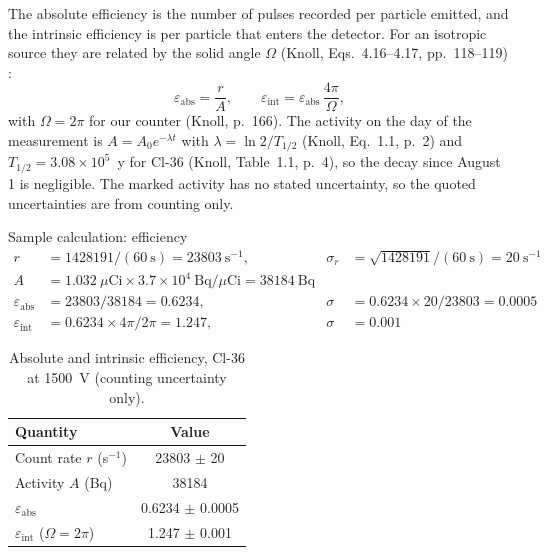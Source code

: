 \documentclass[12pt]{article}
\begin{document}
The absolute efficiency is the number of pulses recorded per particle emitted, and the intrinsic efficiency is per particle that enters the detector. For an isotropic source they are related by the solid angle $\Omega$ (Knoll, Eqs.~4.16--4.17, pp.~118--119) \cite{knoll}:
\begin{equation}
\varepsilon_{\text{abs}} = \frac{r}{A}, \qquad \varepsilon_{\text{int}} = \varepsilon_{\text{abs}}\,\frac{4\pi}{\Omega},
\end{equation}
with $\Omega = 2\pi$ for our counter (Knoll, p.~166). The activity on the day of the measurement is $A = A_0 e^{-\lambda t}$ with $\lambda = \ln 2/T_{1/2}$ (Knoll, Eq.~1.1, p.~2) and $T_{1/2} = 3.08\times10^5$~y for Cl-36 (Knoll, Table~1.1, p.~4), so the decay since August 1 is negligible. The marked activity has no stated uncertainty, so the quoted uncertainties are from counting only.

\begin{samplecalc}{Sample calculation: efficiency}
\begin{align*}
r &= 1428191/(60\ \text{s}) = 23803\ \text{s}^{-1}, & \sigma_r &= \sqrt{1428191}/(60\ \text{s}) = 20\ \text{s}^{-1}\\
A &= 1.032\ \mu\text{Ci} \times 3.7\times10^{4}\ \text{Bq}/\mu\text{Ci} = 38184\ \text{Bq} & &\\
\varepsilon_{\text{abs}} &= 23803/38184 = 0.6234, & \sigma &= 0.6234 \times 20/23803 = 0.0005\\
\varepsilon_{\text{int}} &= 0.6234 \times 4\pi/2\pi = 1.247, & \sigma &= 0.001
\end{align*}
\end{samplecalc}

\begin{table}[!htbp]
\centering\small
\begin{tabular}{lc}
\toprule
\textbf{Quantity} & \textbf{Value} \\
\midrule
Count rate $r$ (s$^{-1}$) & 23803 $\pm$ 20 \\
Activity $A$ (Bq) & 38184 \\
$\varepsilon_{\text{abs}}$ & 0.6234 $\pm$ 0.0005 \\
$\varepsilon_{\text{int}}$ ($\Omega = 2\pi$) & 1.247 $\pm$ 0.001 \\
\bottomrule
\end{tabular}
\caption{Absolute and intrinsic efficiency, Cl-36 at 1500~V (counting uncertainty only).}
\label{tab:eff}
\end{table}
\end{document}
